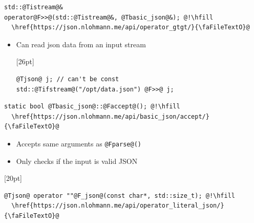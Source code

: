 \documentclass{slides}
\makeatletter
\newcommand{\@slidetitle}{}
\newcommand{\slidetitle}[1]{\renewcommand{\@slidetitle}{#1}}
\makeatother
\begin{document}
\pagebreak
\slidetitle{Parsing}

\begin{tcolorbox}
\begin{lstlisting}
std::@Tistream@&
operator@F>>@(std::@Tistream@&, @Tbasic_json@&); @!\hfill
  \href{https://json.nlohmann.me/api/operator_gtgt/}{\faFileTextO}@
\end{lstlisting}
\end{tcolorbox}

\begin{itemize}
  \item Can read json data from an input stream
    \begin{tcolorbox}{\F{16pt}[26pt]
    \begin{lstlisting}
@Tjson@ j; // can't be const
std::@Tifstream@("/opt/data.json") @F>>@ j;
    \end{lstlisting}
    }\end{tcolorbox}
\end{itemize}

\pagebreak
\slidetitle{Parsing}

\begin{tcolorbox}
\begin{lstlisting}
static bool @Tbasic_json@::@Faccept@(); @!\hfill
  \href{https://json.nlohmann.me/api/basic_json/accept/}{\faFileTextO}@
\end{lstlisting}
\end{tcolorbox}

\begin{itemize}
  \item Accepts same arguments as \lstinline{@Fparse@()}
  \item Only checks if the input is valid JSON
\end{itemize}

\pagebreak
\slidetitle{Parsing}

\begin{tcolorbox}{\F{18pt}[20pt]
\begin{lstlisting}
@Tjson@ operator ""@F_json@(const char*, std::size_t); @!\hfill
  \href{https://json.nlohmann.me/api/operator_literal_json/}{\faFileTextO}@
\end{lstlisting}
}\end{tcolorbox}
\end{document}
